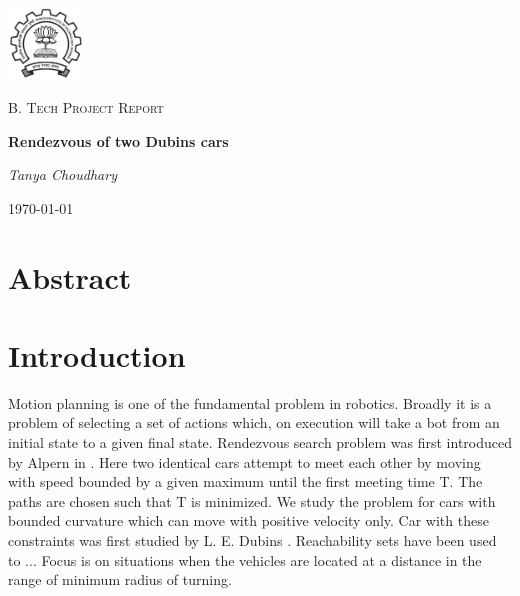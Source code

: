 \documentclass[11pt]{article} %
\begin{document}
\begin{titlepage}
	\centering
	\includegraphics[width=0.15\textwidth]{IITBlogo.png}\par\vspace{1cm}
	{\scshape\LARGE B. Tech Project Report \par}
	\vspace{1cm}
	{\scshape\Large \par}
	\vspace{1.5cm}
	{\huge\bfseries Rendezvous of two Dubins cars \par}
	\vspace{2cm}
	{\Large\itshape Tanya Choudhary\par}

	\vfill

	{\large \today\par}
\end{titlepage}
\section{Abstract}

\section{Introduction}

Motion planning is one of the fundamental problem in robotics. Broadly it is a problem of selecting a set of actions which, on execution will take a bot from an initial state to a given final state. Rendezvous search problem was first introduced by Alpern in \cite{alpern}. Here two identical cars attempt to meet each other by moving with speed bounded by a given maximum until the first meeting time T. The paths are chosen such that T is minimized. We study the problem for cars with bounded curvature which can move with positive velocity only. Car with these constraints was first studied by L. E. Dubins \cite{dubin}. Reachability sets have been used to ... Focus is on situations when the vehicles are located at a distance in the range of minimum radius of turning. 
\end{document}
